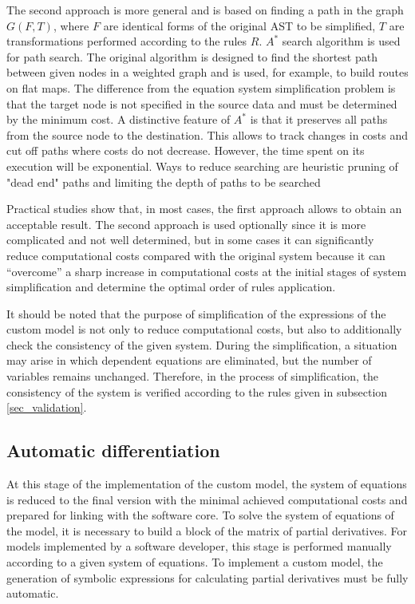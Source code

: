 \documentclass[lettersize,journal]{IEEEtran}
\begin{document}
The second approach is more general and is based on finding a path in the graph \(G(F,T)\), where \(F\) are identical forms of the original AST to be simplified,
\(T\) are transformations performed according to the rules \(R\). \(A^*\) search algorithm \cite{texbook} is used for path search. The original
algorithm is designed to find the shortest path between given nodes in a weighted graph and is used, for example, to build routes on flat maps. 
The difference from the equation system simplification problem is that the target node is not specified in the source data and must be determined 
by the minimum cost. A distinctive feature of \(A^*\) is that it preserves all paths from the source node to the destination. This allows to track
changes in costs and cut off paths where costs do not decrease. However, the time spent on its execution will be exponential. Ways to reduce
searching are heuristic pruning of "dead end" paths and limiting the depth of paths to be searched

Practical studies show that, in most cases, the first approach allows to obtain an acceptable result. The second approach is used optionally
since it is more complicated and not well determined, but in some cases it can significantly reduce computational costs compared with the original 
system because it can “overcome” a sharp increase in computational costs at the initial stages of system simplification and determine 
the optimal order of rules application.

It should be noted that the purpose of simplification of the expressions of the custom model is not only to reduce computational costs, but also to
additionally check the consistency of the given system. During the simplification, a situation may arise in which dependent equations are
eliminated, but the number of variables remains unchanged. Therefore, in the process of simplification, the consistency of the system is verified
according to the rules given in subsection \ref{sec_validation}.

\subsection{Automatic differentiation}

At this stage of the implementation of the custom model, the system of equations is reduced to the final version with the minimal achieved
computational costs and prepared for linking with the software core. To solve the system of equations of the model, it is necessary to build 
a block of the matrix of partial derivatives. For models implemented by a software developer, this stage is performed manually according 
to a given system of equations. To implement a custom model, the generation of symbolic expressions for calculating partial 
derivatives must be fully automatic.
\end{document}
